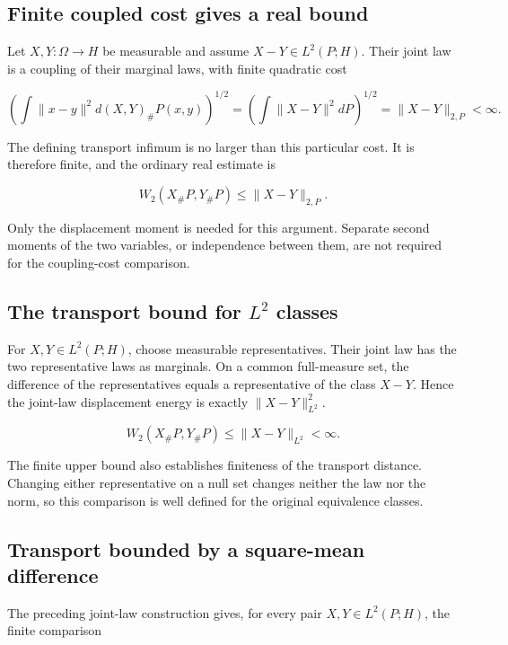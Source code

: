 \documentclass[11pt,a4paper]{article}
\begin{document}
\subsection{\texorpdfstring{Finite coupled cost gives a real bound}{Finite coupled cost gives a real bound}}


Let \(X,Y:\Omega\to H\) be measurable and assume \(X-Y\in L^2(P;H)\). Their joint law is a coupling of their marginal laws, with finite quadratic cost

\[\left(\int\|x-y\|^2d(X,Y)_\#P(x,y)\right)^{1/2}
=\left(\int\|X-Y\|^2dP\right)^{1/2}=\|X-Y\|_{2,P}<\infty.\]


The defining transport infimum is no larger than this particular cost. It is therefore finite, and the ordinary real estimate is

\[W_2(X_\#P,Y_\#P)\le\|X-Y\|_{2,P}.\]


Only the displacement moment is needed for this argument. Separate second moments of the two variables, or independence between them, are not required for the coupling-cost comparison.


\subsection{\texorpdfstring{The transport bound for \(L^2\) classes}{The transport bound for L² classes}}


For \(X,Y\in L^2(P;H)\), choose measurable representatives. Their joint law has the two representative laws as marginals. On a common full-measure set, the difference of the representatives equals a representative of the class \(X-Y\). Hence the joint-law displacement energy is exactly \(\|X-Y\|_{L^2}^2\).

\[W_2(X_\#P,Y_\#P)\le\|X-Y\|_{L^2}<\infty.\]


The finite upper bound also establishes finiteness of the transport distance. Changing either representative on a null set changes neither the law nor the norm, so this comparison is well defined for the original equivalence classes.


\subsection{\texorpdfstring{Transport bounded by a square-mean difference}{Transport bounded by a square-mean difference}}


The preceding joint-law construction gives, for every pair \(X,Y\in L^2(P;H)\), the finite comparison
\end{document}
